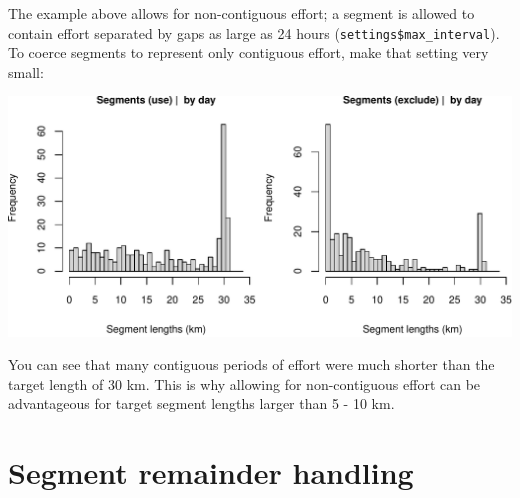 \documentclass[
]{book}
\newenvironment{Shaded}{\begin{snugshade}}{\end{snugshade}}
\newcommand{\AttributeTok}[1]{\textcolor[rgb]{0.77,0.63,0.00}{#1}}
\newcommand{\CommentTok}[1]{\textcolor[rgb]{0.56,0.35,0.01}{\textit{#1}}}
\newcommand{\ConstantTok}[1]{\textcolor[rgb]{0.00,0.00,0.00}{#1}}
\newcommand{\DecValTok}[1]{\textcolor[rgb]{0.00,0.00,0.81}{#1}}
\newcommand{\FunctionTok}[1]{\textcolor[rgb]{0.00,0.00,0.00}{#1}}
\newcommand{\NormalTok}[1]{#1}
\newcommand{\OtherTok}[1]{\textcolor[rgb]{0.56,0.35,0.01}{#1}}
\newcommand{\SpecialCharTok}[1]{\textcolor[rgb]{0.00,0.00,0.00}{#1}}
\newcommand{\StringTok}[1]{\textcolor[rgb]{0.31,0.60,0.02}{#1}}
\begin{document}
The example above allows for non-contiguous effort; a segment is allowed to contain effort separated by gaps as large as 24 hours (\texttt{settings\$max\_interval}). To coerce segments to represent only contiguous effort, make that setting very small:

\begin{Shaded}
\end{Shaded}

\includegraphics{figures/unnamed-chunk-399-1.pdf}

You can see that many contiguous periods of effort were much shorter than the target length of 30 km. This is why allowing for non-contiguous effort can be advantageous for target segment lengths larger than 5 - 10 km.

\hypertarget{segment-remainder-handling}{%
\section*{Segment remainder handling}\label{segment-remainder-handling}}
\end{document}

